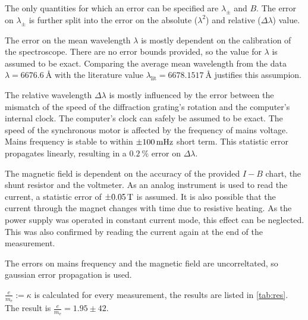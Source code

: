 The only quantities for which an error can be specified are $\lambda_\pm$ and $B$.
The error on $\lambda_\pm$ is further split into the error on the absolute ($\lambda^2$) and relative ($\Delta \lambda$) value.

The error on the mean wavelength $\lambda$ is mostly dependent on the calibration of the spectroscope.
There are no error bounds provided, so the value for $\lambda$ is assumed to be exact. 
Comparing the average mean wavelength from the data $\lambda = \SI{6676.6}{\angstrom}$ with the literature value $\lambda_\text{lit} = \SI{6678.1517}{\angstrom}$ justifies this assumpion.

The relative wavelength $\Delta \lambda$ is mostly influenced by the error between the mismatch of the speed of the diffraction grating's rotation and the computer's internal clock.
The computer's clock can safely be assumed to be exact.
The speed of the synchronous motor is affected by the frequency of mains voltage.
Mains frequency is stable to within $\SI{\pm 100}{\milli\hertz}$ short term.
This statistic error propagates linearly, resulting in a $\SI{0.2}{\percent}$ error on $\Delta\lambda$.

The magnetic field is dependent on the accuracy of the provided $I-B$ chart, the shunt resistor and the voltmeter.
As an analog instrument is used to read the current, a statistic error of $\SI{\pm 0.05}{\tesla}$ is assumed.
It is also possible that the current through the magnet changes with time due to resistive heating.
As the power supply was operated in constant current mode, this effect can be neglected.
This was also confirmed by reading the current again at the end of the measurement.

The errors on mains frequency and the magnetic field are uncorreltated, so gaussian error propagation is used.

$\frac{e}{m_\text{e}} := \kappa$ is calculated for every measurement, the results are listed in \autoref{tab:res}. 
The result is $\frac{e}{m_\text{e}} = \num{1.95} \pm 42$.


